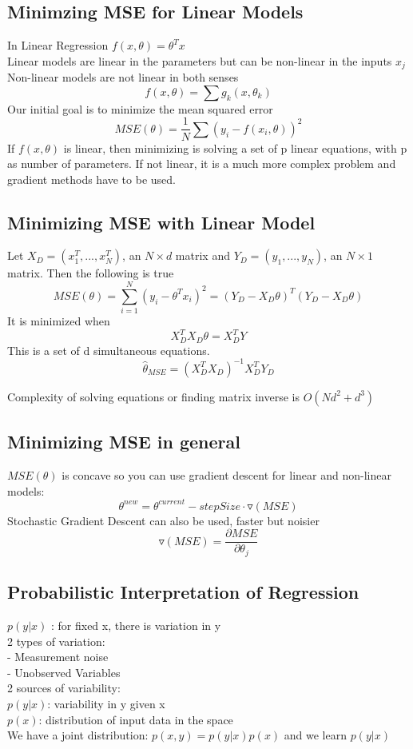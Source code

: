 \documentclass[11pt,psfig]{article}
\begin{document}
\setlength{\parskip}{1.2ex plus0.3ex minus 0.3ex}


\vfill\eject

\subsection*{Minimzing MSE for Linear Models}
In Linear Regression $f(x,\theta)=\theta^T x$\\
Linear models are linear in the parameters but can be non-linear in the inputs $x_j$\\
Non-linear models are not linear in both senses
\[
f(x,\theta)=\sum{g_k(x,\theta_k)}
\]
Our initial goal is to minimize the mean squared error
\[
MSE(\theta) = \frac{1}{N} \sum{ (y_i-f(x_i,\theta))^2 }
\]
If $f(x,\theta)$ is linear, then minimizing is solving a set of p linear equations, with p as number of parameters. If not linear, it is a much more complex problem and gradient methods have to be used. 

\subsection*{Minimizing MSE with Linear Model}

Let $X_D=(x_1^T,...,x_N^T)$, an $N \times d$ matrix and $Y_D=(y_1,...,y_N)$, an $N \times 1$ matrix.
Then the following is true
\[
MSE(\theta) = \sum_{i=1}^N{(y_i-\theta^T x_i)^2} = (Y_D-X_D\theta)^T(Y_D-X_D\theta)
\]
It is minimized when
\[
X_D^T X_D \theta = X_D^T Y
\]
This is a set of d simultaneous equations.
\[
\hat{\theta}_{MSE} = (X_D^T X_D)^{-1} X_D^T Y_D
\]

Complexity of solving equations or finding matrix inverse is $O(N d^2 + d^3)$

\subsection*{Minimizing MSE in general}
$MSE(\theta)$ is concave so you can use gradient descent for linear and non-linear models:
     \[
		\theta^{new} = \theta^{current} - stepSize\cdot \triangledown(MSE)
		\]
Stochastic Gradient Descent can also be used, faster but noisier
\[
\triangledown(MSE) = \frac{\partial MSE}{\partial \theta_j}
\]

\subsection*{Probabilistic Interpretation of Regression}
$p(y|x)$ : for fixed x, there is variation in y\\
2 types of variation:\\
     - Measurement noise\\
     - Unobserved Variables\\
2 sources of variability:\\
     $p(y|x)$: variability in y given x\\
     $p(x)$: distribution of input data in the space\\
We have a joint distribution: $p(x,y) = p(y|x)p(x)$ and we learn $p(y|x)$
\end{document}
